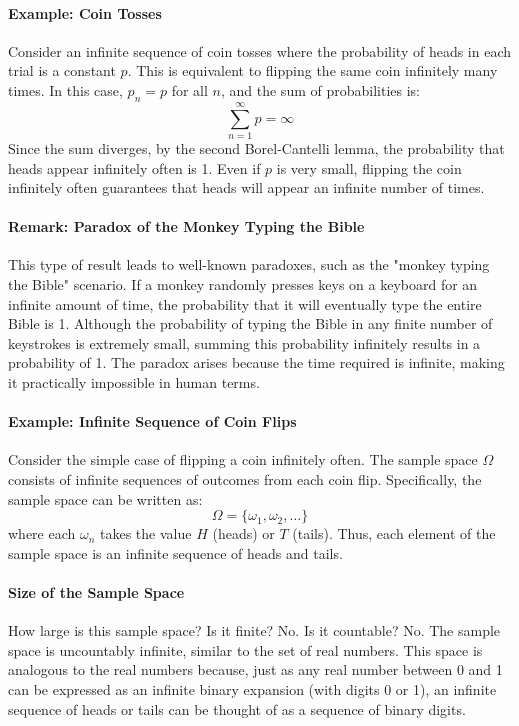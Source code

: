     \paragraph{Example: Coin Tosses}
    Consider an infinite sequence of coin tosses where the probability of heads in each trial is a constant $p$. This is equivalent to flipping the same coin infinitely many times. In this case, $p_n = p$ for all $n$, and the sum of probabilities is:
    \[
    \sum_{n=1}^{\infty} p = \infty
    \]
    Since the sum diverges, by the second Borel-Cantelli lemma, the probability that heads appear infinitely often is 1. Even if $p$ is very small, flipping the coin infinitely often guarantees that heads will appear an infinite number of times.
    
    \paragraph{Remark: Paradox of the Monkey Typing the Bible}
    This type of result leads to well-known paradoxes, such as the "monkey typing the Bible" scenario. If a monkey randomly presses keys on a keyboard for an infinite amount of time, the probability that it will eventually type the entire Bible is 1. Although the probability of typing the Bible in any finite number of keystrokes is extremely small, summing this probability infinitely results in a probability of 1. The paradox arises because the time required is infinite, making it practically impossible in human terms.

    \paragraph{Example: Infinite Sequence of Coin Flips}
    Consider the simple case of flipping a coin infinitely often. The sample space $\Omega$ consists of infinite sequences of outcomes from each coin flip. Specifically, the sample space can be written as:
    \[
    \Omega = \{\omega_1, \omega_2, \dots \}
    \]
    where each $\omega_n$ takes the value $H$ (heads) or $T$ (tails). Thus, each element of the sample space is an infinite sequence of heads and tails.
    
    \paragraph{Size of the Sample Space}
    How large is this sample space? Is it finite? No. Is it countable? No. The sample space is uncountably infinite, similar to the set of real numbers. This space is analogous to the real numbers because, just as any real number between 0 and 1 can be expressed as an infinite binary expansion (with digits 0 or 1), an infinite sequence of heads or tails can be thought of as a sequence of binary digits.
    
